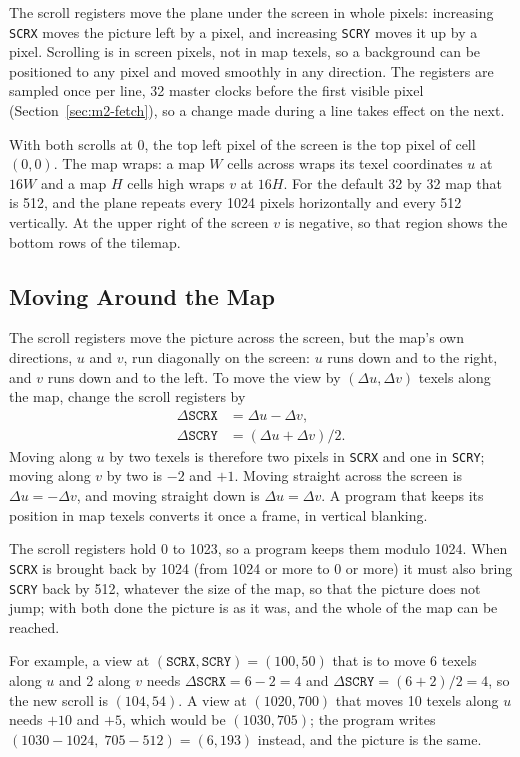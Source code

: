 The scroll registers move the plane under the screen in whole pixels: increasing \texttt{SCRX} moves the picture left
by a pixel, and increasing \texttt{SCRY} moves it up by a pixel. Scrolling is in screen pixels, not in map texels, so a
background can be positioned to any pixel and moved smoothly in any direction. The registers are sampled once per line,
32 master clocks before the first visible pixel (Section~\ref{sec:m2-fetch}), so a change made during a line takes
effect on the next.

With both scrolls at 0, the top left pixel of the screen is the top pixel of cell $(0, 0)$. The map wraps: a map $W$
cells across wraps its texel coordinates $u$ at $16W$ and a map $H$ cells high wraps $v$ at $16H$. For the default 32
by 32 map that is 512, and the plane repeats every 1024 pixels horizontally and every 512 vertically. At the upper
right of the screen $v$ is negative, so that region shows the bottom rows of the tilemap.

\subsection{Moving Around the Map}
\label{sec:m2-moving}

The scroll registers move the picture across the screen, but the map's own directions, $u$ and $v$, run diagonally on
the screen: $u$ runs down and to the right, and $v$ runs down and to the left. To move the view by $(\Delta u, \Delta
	v)$ texels along the map, change the scroll registers by
\begin{align*}
	\Delta\texttt{SCRX} & = \Delta u - \Delta v,       \\
	\Delta\texttt{SCRY} & = (\Delta u + \Delta v) / 2.
\end{align*}
Moving along $u$ by two texels is therefore two pixels in \texttt{SCRX} and one in \texttt{SCRY}; moving along $v$ by two
is $-2$ and $+1$. Moving straight across the screen is $\Delta u = -\Delta v$, and moving straight down is $\Delta u = \Delta v$.
A program that keeps its position in map texels converts it once a frame, in vertical blanking.

The scroll registers hold 0 to 1023, so a program keeps them modulo 1024. When \texttt{SCRX} is brought back by 1024
(from 1024 or more to 0 or more) it must also bring \texttt{SCRY} back by 512, whatever the size of the map, so that
the picture does not jump; with both done the picture is as it was, and the whole of the map can be reached.

For example, a view at $(\texttt{SCRX}, \texttt{SCRY}) = (100, 50)$ that is to move 6 texels along $u$ and 2 along $v$
needs $\Delta\texttt{SCRX} = 6 - 2 = 4$ and $\Delta\texttt{SCRY} = (6 + 2)/2 = 4$, so the new scroll is $(104, 54)$. A
view at $(1020, 700)$ that moves 10 texels along $u$ needs $+10$ and $+5$, which would be $(1030, 705)$; the program
writes $(1030 - 1024,\; 705 - 512) = (6, 193)$ instead, and the picture is the same.

